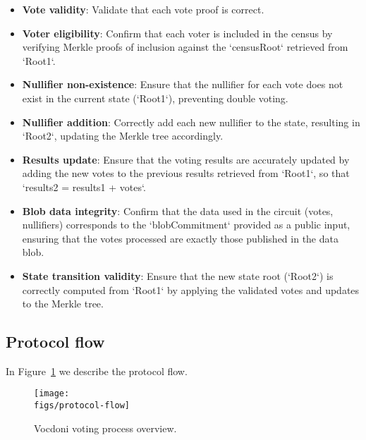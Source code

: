 \begin{mdframed}
\begin{minipage}[H]{1\textwidth}
\begin{spacing}{1.25}
\begin{itemize}
				\item \textbf{Vote validity}: Validate that each vote proof is correct.
				\item \textbf{Voter eligibility}: Confirm that each voter is included in the census by verifying Merkle proofs of inclusion against the `censusRoot` retrieved from `Root1`.
				\item \textbf{Nullifier non-existence}: Ensure that the nullifier for each vote does not exist in the current state (`Root1`), preventing double voting.
				\item \textbf{Nullifier addition}: Correctly add each new nullifier to the state, resulting in `Root2`, updating the Merkle tree accordingly.
				\item \textbf{Results update}: Ensure that the voting results are accurately updated by adding the new votes to the previous results retrieved from `Root1`, so that `results2 = results1 + votes`.
				\item \textbf{Blob data integrity}: Confirm that the data used in the circuit (votes, nullifiers) corresponds to the `blobCommitment` provided as a public input, ensuring that the votes processed are exactly those published in the data blob.
				\item \textbf{State transition validity}: Ensure that the new state root (`Root2`) is correctly computed from `Root1` by applying the validated votes and updates to the Merkle tree.
			\end{itemize}
			\vspace{-0.3cm}
		\end{spacing}
	\end{minipage}
\end{mdframed}

\subsection{Protocol flow}
\label{sec:vocdoni-protocol:flow}

In Figure~\ref{fig:protocol-flow} we describe the protocol flow.


\begin{figure}[H]
	\centerline{\texttt{[image: \\figs/protocol-flow]}}
	\caption{Vocdoni voting process overview.}
	\label{fig:protocol-flow}
\end{figure}

